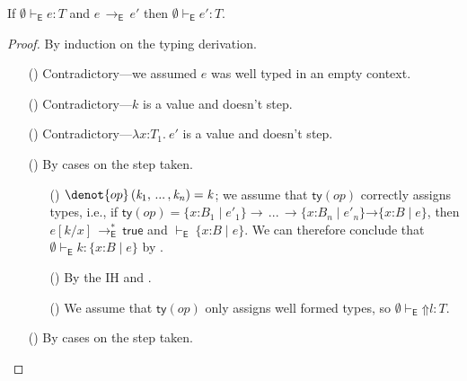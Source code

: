 \documentclass[9pt]{extarticle}
\newcommand{\ottnt}[1]{\mathit{#1}}
\newcommand{\ottmv}[1]{\mathit{#1}}
\newcommand{\ottsym}[1]{#1}
\begin{document}
\begin{lemma}
  \label{lem:eideticpreservation}
  If $ \emptyset   \vdash _{  \mathsf{E}  }  \ottnt{e}  :  \ottnt{T} $ and $\ottnt{e} \,  \longrightarrow _{  \mathsf{E}  }  \, \ottnt{e'}$ then $ \emptyset   \vdash _{  \mathsf{E}  }  \ottnt{e'}  :  \ottnt{T} $.
\begin{proof}
    By induction on the typing derivation.
{\iffull
    \begin{itemize}
    \item[(\T{Var})] Contradictory---we assumed $\ottnt{e}$ was well typed
      in an empty context.
    \item[(\T{Const})] Contradictory---$\ottnt{k}$ is a value and doesn't step.
    \item[(\T{Abs})] Contradictory---$ \lambda \mathit{x} \mathord{:} \ottnt{T_{{\mathrm{1}}}} .~  \ottnt{e'} $ is a value and
      doesn't step.
    \item[(\T{Op})] By cases on the step taken.
\begin{itemize}
      \item[(\E{Op})] $\denot{ op } \, \ottsym{(}  \ottnt{k_{{\mathrm{1}}}}  \ottsym{,} \, ... \, \ottsym{,}  \ottnt{k_{\ottmv{n}}}  \ottsym{)}  \ottsym{=}  \ottnt{k}$; we assume that
        $ \mathsf{ty} (\mathord{ \ottnt{op} }) $ correctly assigns types, i.e., if $ \mathsf{ty} (\mathord{ \ottnt{op} })   \ottsym{=}   {}   \{ \mathit{x} \mathord{:} \ottnt{B_{{\mathrm{1}}}} \mathrel{\mid} \ottnt{e'_{{\mathrm{1}}}} \}   \rightarrow \, ... \, \rightarrow   \{ \mathit{x} \mathord{:} \ottnt{B_{\ottmv{n}}} \mathrel{\mid} \ottnt{e'_{\ottmv{n}}} \}   {} \mathord{ \rightarrow }  \{ \mathit{x} \mathord{:} \ottnt{B} \mathrel{\mid} \ottnt{e} \}  $, then $ \ottnt{e}  [  \ottnt{k} / \mathit{x}  ]  \,  \longrightarrow ^{*}_{  \mathsf{E}  }  \,  \mathsf{true} $ and $ \mathord{  \vdash _{  \mathsf{E}  } }~  \{ \mathit{x} \mathord{:} \ottnt{B} \mathrel{\mid} \ottnt{e} \}  $. We can therefore conclude
        that $ \emptyset   \vdash _{  \mathsf{E}  }  \ottnt{k}  :   \{ \mathit{x} \mathord{:} \ottnt{B} \mathrel{\mid} \ottnt{e} \}  $ by .
      \item[(\E{OpInner})] By the IH and .
      \item[(\E{OpRaise})] We assume that $ \mathsf{ty} (\mathord{ \ottnt{op} }) $ only assigns
        well formed types, so $ \emptyset   \vdash _{  \mathsf{E}  }   \mathord{\Uparrow}  \ottnt{l}   :  \ottnt{T} $.
      \end{itemize}
    \item[(\T{App})] By cases on the step taken.

\end{itemize}}
\end{proof}
\end{lemma}
\end{document}
